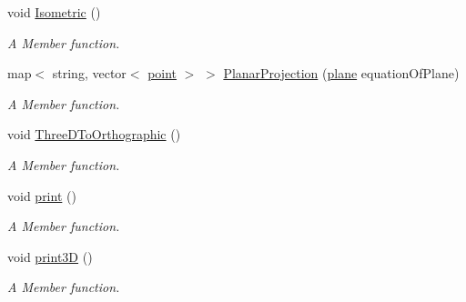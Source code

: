 \begin{DoxyCompactItemize}
void \hyperlink{classThreeDGraph__class_aec760645bb97742c87a50fe66aa68efe}{Isometric} ()
\begin{DoxyCompactList}\small\item\em A Member function. \end{DoxyCompactList}\item 
map$<$ string, vector$<$ \hyperlink{structpoint}{point} $>$ $>$ \hyperlink{classThreeDGraph__class_a9c802d66d5c79dd867f3566348d49921}{Planar\+Projection} (\hyperlink{structplane}{plane} equation\+Of\+Plane)
\begin{DoxyCompactList}\small\item\em A Member function. \end{DoxyCompactList}\item 
void \hyperlink{classThreeDGraph__class_ae69c2ee22498d903d1afa6b988edd1b6}{Three\+D\+To\+Orthographic} ()
\begin{DoxyCompactList}\small\item\em A Member function. \end{DoxyCompactList}\item 
void \hyperlink{classThreeDGraph__class_af53c26ef3f673e77e1213789fe14c8a2}{print} ()
\begin{DoxyCompactList}\small\item\em A Member function. \end{DoxyCompactList}\item 
void \hyperlink{classThreeDGraph__class_a08a1a3131c7090b8f783809f07810725}{print3D} ()
\begin{DoxyCompactList}\small\item\em A Member function. \end{DoxyCompactList}\end{DoxyCompactItemize}
